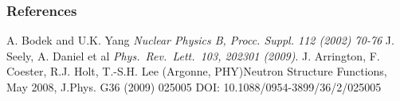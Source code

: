 \documentclass[12pt,usenames,dvipsnames]{beamer}
\begin{document}
\begin{frame}[allowframebreaks]
\vspace*{-3pt}
\frametitle{References}
\footnotesize{
\begin{thebibliography}{9} %
\vspace*{-20pt}
 A. Bodek and U.K. Yang
\newblock \emph{Nuclear Physics B, Procc. Suppl. 112 (2002) 70-76 }			
\vspace*{-8pt}				
 J. Seely, A. Daniel et al  
\newblock \emph{Phys.\ Rev.\ Lett.\   103, 202301 (2009)}.
 J. Arrington, F. Coester, R.J. Holt, T.-S.H. Lee (Argonne, PHY)\newblock Neutron Structure Functions, May 2008, J.Phys. G36 (2009) 025005
DOI: 10.1088/0954-3899/36/2/025005


\end{thebibliography}
}
\end{frame}
\end{document}
